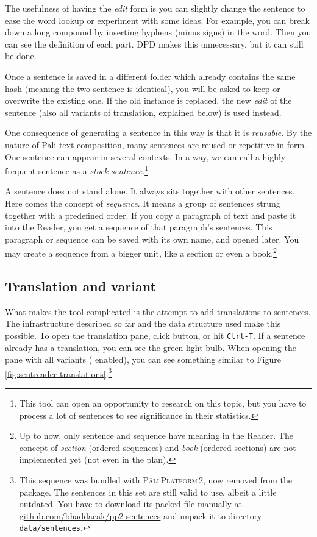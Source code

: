 The usefulness of having the \emph{edit} form is you can slightly change the sentence to ease the word lookup or experiment with some ideas. For example, you can break down a long compound by inserting hyphens (minus signs) in the word. Then you can see the definition of each part. DPD makes this unnecessary, but it can still be done.

Once a sentence is saved in a different folder which already contains the same hash (meaning the two sentence is identical), you will be asked to keep or overwrite the existing one. If the old instance is replaced, the new \emph{edit} of the sentence (also all variants of translation, explained below) is used instead.

One consequence of generating a sentence in this way is that it is \emph{reusable}. By the nature of Pāli text composition, many sentences are reused or repetitive in form. One sentence can appear in several contexts. In a way, we can call a highly frequent sentence as a \emph{stock sentence}.\footnote{This tool can open an opportunity to research on this topic, but you have to process a lot of sentences to see significance in their statistics.}

A sentence does not stand alone. It always sits together with other sentences. Here comes the concept of \emph{sequence}. It means a group of sentences strung together with a predefined order. If you copy a paragraph of text and paste it into the Reader, you get a sequence of that paragraph's sentences. This paragraph or sequence can be saved with its own name, and opened later. You may create a sequence from a bigger unit, like a section or even a book.\footnote{Up to now, only sentence and sequence have meaning in the Reader. The concept of \emph{section} (ordered sequences) and \emph{book} (ordered sections) are not implemented yet (not even in the plan).}

\subsection{Translation and variant}

What makes the tool complicated is the attempt to add translations to sentences. The infrastructure described so far and the data structure used make this possible. To open the translation pane, click {\faSix {}} button, or hit \texttt{Ctrl-T}. If a sentence already has a translation, you can see the green light bulb. When opening the pane with all variants ({\faSix {}} enabled), you can see something similar to Figure \ref{fig:sentreader-translations}.\footnote{This sequence was bundled with \textsc{Pāli\,Platform\,2}, now removed from the package. The sentences in this set are still valid to use, albeit a little outdated. You have to download its packed file manually at \url{github.com/bhaddacak/pp2-sentences} and unpack it to directory \texttt{data/sentences}.}

